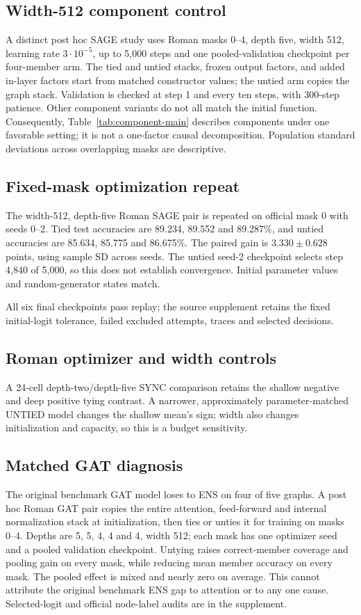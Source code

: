 \subsection{Width-512 component control}\label{app:controls}
A distinct post hoc SAGE study uses Roman masks 0--4, depth five,
width 512, learning rate $3\cdot10^{-5}$, up to 5,000 steps and one
pooled-validation checkpoint per four-member arm. The tied and untied
stacks, frozen output factors, and added in-layer factors start from
matched constructor values; the untied arm copies the graph stack.
Validation is checked at step 1 and every ten steps, with 300-step
patience. Other component variants do not all match the initial function.
Consequently, Table~\ref{tab:component-main} describes components under one favorable
setting; it is not a one-factor causal decomposition. Population
standard deviations across overlapping masks are descriptive.

\subsection{Fixed-mask optimization repeat}\label{app:fixed-mask-v4}
The width-512, depth-five Roman SAGE pair is repeated on official mask 0
with seeds 0--2. Tied test accuracies are 89.234, 89.552 and 89.287\%,
and untied accuracies are 85.634, 85.775 and 86.675\%. The paired gain
is $3.330\pm0.628$ points, using sample SD across seeds. The untied
seed-2 checkpoint selects step 4,840 of 5,000, so this does not establish
convergence. Initial parameter values and random-generator states match.

All six final checkpoints pass replay; the source supplement retains the fixed initial-logit tolerance, failed excluded attempts, traces and selected decisions.

\subsection{Roman optimizer and width controls}\label{app:roman-optimizer}\label{app:roman-narrow}
A 24-cell depth-two/depth-five SYNC comparison retains the shallow negative and deep positive tying contrast. A narrower, approximately parameter-matched UNTIED model changes the shallow mean's sign; width also changes initialization and capacity, so this is a budget sensitivity.

\subsection{Matched GAT diagnosis}\label{app:gat-pair}
The original benchmark GAT model loses to ENS on four of five graphs. A post hoc
Roman GAT pair copies the entire attention, feed-forward and internal
normalization stack at initialization, then ties or unties it for
training on masks 0--4. Depths are 5, 5, 4, 4 and 4, width 512; each
mask has one optimizer seed and a pooled validation checkpoint.
Untying raises correct-member coverage and pooling gain on every mask,
while reducing mean member accuracy on every mask. The pooled effect
is mixed and nearly zero on average. This cannot attribute the original benchmark
ENS gap to attention or to any one cause. Selected-logit and official
node-label audits are in the supplement.

